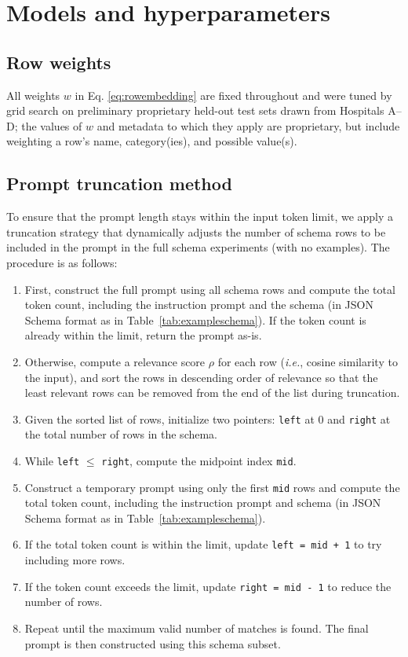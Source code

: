 \section{Models and hyperparameters}
\label{sec:experiment}

\subsection{Row weights}
All weights $w$ in Eq. \ref{eq:rowembedding} are fixed throughout and were tuned by grid search on preliminary proprietary held-out test sets drawn from Hospitals A--D; the values of $w$ and metadata to which they apply are proprietary, but include weighting a row's name, category(ies), and possible value(s).

\subsection{Prompt truncation method}
To ensure that the prompt length stays within the input token limit, we apply a truncation strategy that dynamically adjusts the number of schema rows to be included in the prompt in the full schema experiments (with no examples). The procedure is as follows:

\begin{enumerate}
\item First, construct the full prompt using all schema rows and compute the total token count, including the instruction prompt and the schema (in JSON Schema format as in Table~\ref{tab:exampleschema}). If the token count is already within the limit, return the prompt as-is.

\item Otherwise, compute a relevance score $\rho$ for each row (\textit{i.e.}, cosine similarity to the input), and sort the rows in descending order of relevance so that the least relevant rows can be removed from the end of the list during truncation. 

\item Given the sorted list of rows, initialize two pointers:  \texttt{left} at 0 and  \texttt{right} at the total number of rows in the schema.

\item While \texttt{left} $\leq$ \texttt{right}, compute the midpoint index \texttt{mid}.

\item Construct a temporary prompt using only the first \texttt{mid} rows and compute the total token count, including the instruction prompt and schema (in JSON Schema format as in Table~\ref{tab:exampleschema}).

\item If the total token count is within the limit, update \texttt{left = mid + 1} to try including more rows.

\item If the token count exceeds the limit, update \texttt{right = mid - 1} to reduce the number of rows. 

\item Repeat until the maximum valid number of matches is found. The final prompt is then constructed using this schema subset.
\end{enumerate}